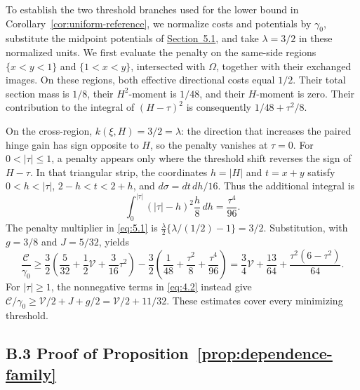To establish the two threshold branches used for the lower bound in Corollary~\ref{cor:uniform-reference}, we normalize costs and potentials by \(\gamma_0\), substitute the midpoint potentials of \hyperref[sec:uniform-reference]{Section~5.1}, and take \(\lambda=3/2\) in these normalized units. We first evaluate the penalty on the same-side regions \(\{x<y<1\}\) and \(\{1<x<y\}\), intersected with \(\Omega\), together with their exchanged images. On these regions, both effective directional costs equal \(1/2\). Their total section mass is \(1/8\), their \(H^2\)-moment is \(1/48\), and their \(H\)-moment is zero. Their contribution to the integral of \((H-\tau)^2\) is consequently \(1/48+\tau^2/8\).

On the cross-region, \(k(\xi,H)=3/2=\lambda\): the direction that increases the paired hinge gain has sign opposite to \(H\), so the penalty vanishes at \(\tau=0\). For \(0<|\tau|\le1\), a penalty appears only where the threshold shift reverses the sign of \(H-\tau\). In that triangular strip, the coordinates \(h=|H|\) and \(t=x+y\) satisfy \(0<h<|\tau|\), \(2-h<t<2+h\), and \(d\sigma=dt\,dh/16\). Thus the additional integral is
\[
\int_0^{|\tau|}(|\tau|-h)^2\frac h8\,dh=\frac{\tau^4}{96}.
\]
The penalty multiplier in \eqref{eq:5.1} is \(\frac\lambda2\{\lambda/(1/2)-1\}=3/2\). Substitution, with \(g=3/8\) and \(J=5/32\), yields
\[
\frac{\mathcal C}{\gamma_0}
\ge\frac32\left(\frac5{32}+\frac12\mathcal V+\frac3{16}\tau^2\right)
-\frac32\left(\frac1{48}+\frac{\tau^2}{8}+\frac{\tau^4}{96}\right)
=\frac34\mathcal V+\frac{13}{64}+\frac{\tau^2(6-\tau^2)}{64}.
\]
For \(|\tau|\ge1\), the nonnegative terms in \eqref{eq:4.2} instead give \(\mathcal C/\gamma_0\ge\mathcal V/2+J+g/2=\mathcal V/2+11/32\). These estimates cover every minimizing threshold.

\subsection{B.3 Proof of Proposition~\ref{prop:dependence-family}}\label{app:dependence-family-proof}

